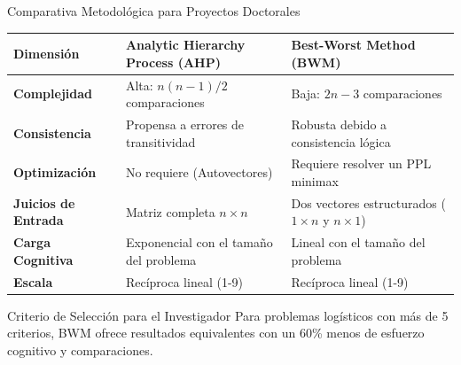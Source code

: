 \documentclass[aspectratio=169, 10pt]{beamer}
\begin{document}
\begin{frame}{Comparativa Metodológica para Proyectos Doctorales}
    \begin{center}
        \scriptsize
        \begin{tabular}{p{2.4cm}p{4.6cm}p{4.6cm}}
            \toprule
            \textbf{Dimensión} & \textbf{Analytic Hierarchy Process (AHP)} & \textbf{Best-Worst Method (BWM)} \\
            \midrule
            \textbf{Complejidad} & Alta: $n(n-1)/2$ comparaciones & Baja: $2n-3$ comparaciones \\
            \textbf{Consistencia} & Propensa a errores de transitividad & Robusta debido a consistencia lógica \\
            \textbf{Optimización} & No requiere (Autovectores) & Requiere resolver un PPL minimax \\
            \textbf{Juicios de Entrada} & Matriz completa $n \times n$ & Dos vectores estructurados ($1 \times n$ y $n \times 1$) \\
            \textbf{Carga Cognitiva} & Exponencial con el tamaño del problema & Lineal con el tamaño del problema \\
            \textbf{Escala} & Recíproca lineal (1-9) & Recíproca lineal (1-9) \\
            \bottomrule
        \end{tabular}
    \end{center}
    \begin{block}{Criterio de Selección para el Investigador}
        \scriptsize
        Para problemas logísticos con más de 5 criterios, BWM ofrece resultados equivalentes con un 60\% menos de esfuerzo cognitivo y comparaciones.
    \end{block}
\end{frame}
\end{document}
